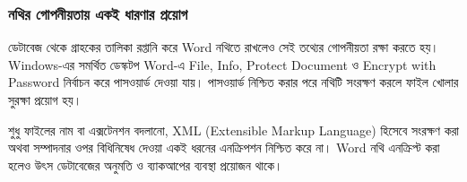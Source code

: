 \subsubsection{নথির গোপনীয়তায় একই ধারণার প্রয়োগ}
ডেটাবেজ থেকে গ্রাহকের তালিকা রপ্তানি করে Word নথিতে রাখলেও সেই তথ্যের গোপনীয়তা রক্ষা করতে হয়। Windows-এর সমর্থিত ডেস্কটপ Word-এ File, Info, Protect Document ও Encrypt with Password নির্বাচন করে পাসওয়ার্ড দেওয়া যায়। পাসওয়ার্ড নিশ্চিত করার পরে নথিটি সংরক্ষণ করলে ফাইল খোলার সুরক্ষা প্রয়োগ হয়।

শুধু ফাইলের নাম বা এক্সটেনশন বদলানো, XML (Extensible Markup Language) হিসেবে সংরক্ষণ করা অথবা সম্পাদনার ওপর বিধিনিষেধ দেওয়া একই ধরনের এনক্রিপশন নিশ্চিত করে না। Word নথি এনক্রিপ্ট করা হলেও উৎস ডেটাবেজের অনুমতি ও ব্যাকআপের ব্যবস্থা প্রয়োজন থাকে।


